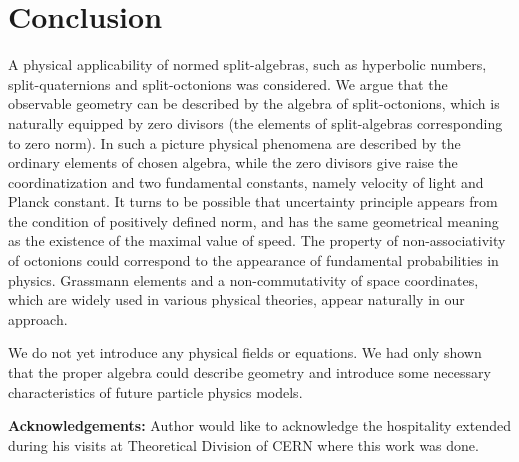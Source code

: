 \documentclass[a4paper,12pt]{article}
\begin{document}

\section{Conclusion}

A physical applicability of normed split-algebras, such as hyperbolic numbers, 
split-quaternions and split-octonions was considered. We argue that the observable 
geometry can be described by the algebra of split-octonions, which is naturally 
equipped by zero divisors (the elements of split-algebras corresponding to zero norm). 
In such a picture physical phenomena are described by the ordinary elements of chosen 
algebra, while the zero divisors give raise the coordinatization and two fundamental 
constants, namely velocity of light and Planck constant. It turns to be possible that 
uncertainty principle appears from the condition of positively defined norm, and has 
the same geometrical meaning as the existence of the maximal value of speed. The 
property of non-associativity of octonions could correspond to the appearance of 
fundamental probabilities in physics. Grassmann elements and a non-commutativity of 
space coordinates, which are widely used in various physical theories, appear naturally 
in our approach. 

We do not yet introduce any physical fields or equations. We had only shown that the 
proper algebra could describe geometry and introduce some necessary characteristics 
of future particle physics models. 


\vskip 1cm

{\bf Acknowledgements:} Author would like to acknowledge the hospitality
extended during his visits at Theoretical Division of CERN where this work was done.

\end{document}
